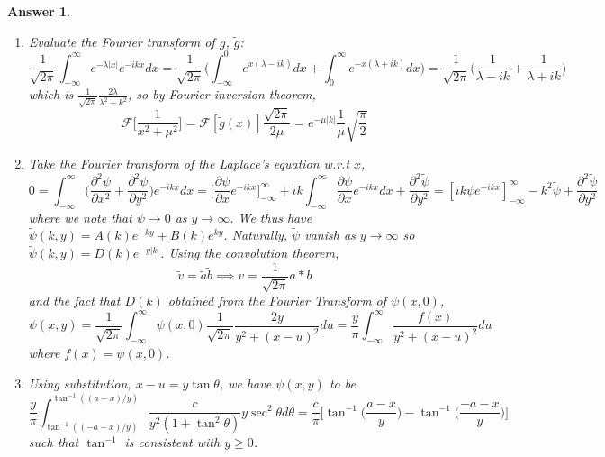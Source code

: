 \documentclass[a4paper]{article}
\newtheorem{ans}{Answer}[section]
\theoremstyle{new}
\begin{document}
\begin{ans}\leavevmode
\begin{enumerate}[label=(\alph*)]
\item Evaluate the Fourier transform of $g$, $\tilde{g}$:
$$\frac{1}{\sqrt{2\pi}}\int_{-\infty}^\infty e^{-\lambda|x|}e^{-ikx}dx=\frac{1}{\sqrt{2\pi}}\bigg(\int_{-\infty}^0e^{x(\lambda-ik)}dx+\int_0^\infty e^{-x(\lambda+ik)}dx\bigg)=\frac{1}{\sqrt{2\pi}}\bigg(\frac{1}{\lambda-ik}+\frac{1}{\lambda+ik}\bigg)$$
which is $\frac{1}{\sqrt{2\pi}}\frac{2\lambda}{\lambda^2+k^2}$, so by Fourier inversion theorem,
$$\mathcal{F}\bigg[\frac{1}{x^2+\mu^2}\bigg]=\mathcal{F}[\tilde{g}(x)]\frac{\sqrt{2\pi}}{2\mu}=e^{-\mu|k|}\frac{1}{\mu}\sqrt{\frac{\pi}{2}}$$
\item  Take the Fourier transform of the Laplace's equation w.r.t $x$,
$$0=\int_{-\infty}^\infty\bigg(\frac{\partial^2\psi}{\partial x^2}+\frac{\partial^2\psi}{\partial y^2}\bigg)e^{-ikx}dx=\bigg[\frac{\partial\psi}{\partial x}e^{-ikx}\bigg]^\infty_{-\infty}+ik\int_{-\infty}^\infty\frac{\partial\psi}{\partial x}e^{-ikx}dx+\frac{\partial^2\tilde{\psi}}{\partial y^2}=[ik\psi e^{-ikx}]^\infty_{-\infty}-k^2\tilde{\psi}+\frac{\partial^2\tilde{\psi}}{\partial y^2}$$
where we note that $\psi\rightarrow 0$ as $y\rightarrow\infty$. We thus have $\tilde{\psi}(k,y)=A(k)e^{-ky}+B(k)e^{ky}$. Naturally, $\tilde{\psi}$ vanish as $y\rightarrow\infty$ so $\tilde{\psi}(k,y)=D(k)e^{-y|k|}$. Using the convolution theorem,  $$\tilde{v}=\tilde{a}\tilde{b}\implies v=\frac{1}{\sqrt{2\pi}}a*b$$ and the fact that $D(k)$ obtained from the Fourier Transform of $\psi(x,0)$, 
$$\psi(x,y)=\frac{1}{\sqrt{2\pi}}\int_{-\infty}^\infty\psi(x,0)\frac{1}{\sqrt{2\pi}}\frac{2y}{y^2+(x-u)^2}du=\frac{y}{\pi}\int_{-\infty}^\infty\frac{f(x)}{y^2+(x-u)^2}du$$
where $f(x)=\psi(x,0)$.
\item Using substitution, $x-u=y\tan\theta$, we have $\psi(x,y)$ to be
$$\frac{y}{\pi}\int_{\tan^{-1}((-a-x)/y)}^{\tan^{-1}((a-x)/y)}\frac{c}{y^2(1+\tan^2\theta)}y\sec^2\theta d\theta=\frac{c}{\pi}\bigg[\tan^{-1}\bigg(\frac{a-x}{y}\bigg)-\tan^{-1}\bigg(\frac{-a-x}{y}\bigg)\bigg]$$
such that $\tan^{-1}$ is consistent with $y\geq0$.
\end{enumerate}
\end{ans}
\newpage
\end{document}
